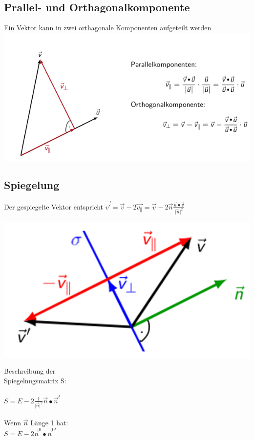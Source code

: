 			
			\subsection{Prallel- und Orthagonalkomponente}
			Ein Vektor kann in zwei orthagonale Komponenten aufgeteilt werden \\					\includegraphics[width=0.65\linewidth]{Bilder/parallel-orthagonal}
			
			
			\subsection{Spiegelung}
			Der gespiegelte Vektor entspricht $\vec{v'} = \vec{v} - 2 \vec{v_{\parallel}} = \vec{v} - 2 \vec{n} \frac{\vec{n} \bullet \vec{v}}{\vert \vec{n} \vert ^2} $ \\
			\begin{minipage}[b]{.5\linewidth} 
  			\includegraphics[width=\linewidth]{Bilder/spiegelung}
			\end{minipage}
			\hfill
			\begin{minipage}[b]{.45\linewidth} 
			Beschreibung der \\
			Spiegelnugsmatrix S: \\
			\\
			$S = E - 2 \frac{1}{\vert \vec{n} \vert ^2} \vec{n} \bullet \vec{n}^t$  	\\
			\\
			Wenn $\vec{n}$  Länge 1 hat: \\
			$S = E - 2 \vec{n}^0 \bullet \vec{n}^{0 t}$  	
			\end{minipage}						
			
